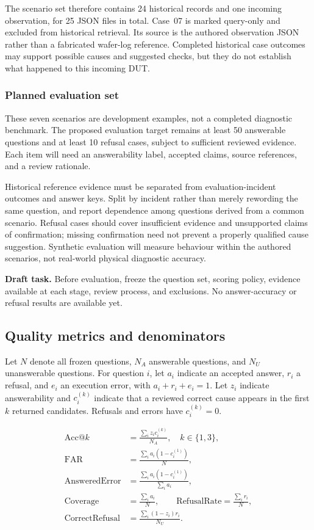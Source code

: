 \documentclass[conference]{IEEEtran}
\newcommand{\draftnote}[1]{%
\par\smallskip\noindent
\colorbox{pale}{%
\parbox{\dimexpr\columnwidth-2\fboxsep\relax}{%
\small\textbf{Draft task.} #1}}%
\par\smallskip}
\begin{document}
The scenario set therefore contains 24 historical records
and one incoming observation, for 25 JSON files in total.
Case~07 is marked query-only and excluded from historical
retrieval. Its source is the authored observation JSON rather
than a fabricated wafer-log reference. Completed historical
case outcomes may support possible causes and suggested checks,
but they do not establish what happened to this incoming DUT.

\subsubsection{Planned evaluation set}

These seven scenarios are development examples, not a completed
diagnostic benchmark. The proposed evaluation target remains
at least 50 answerable questions and at least 10 refusal cases,
subject to sufficient reviewed evidence. Each item will need
an answerability label, accepted claims, source references,
and a review rationale.

Historical reference evidence must be separated from
evaluation-incident outcomes and answer keys. Split by incident
rather than merely rewording the same question, and report
dependence among questions derived from a common scenario.
Refusal cases should cover insufficient evidence and unsupported
claims of confirmation; missing confirmation need not prevent
a properly qualified cause suggestion. Synthetic evaluation
will measure behaviour within the authored scenarios,
not real-world physical diagnostic accuracy.

\draftnote{
Before evaluation, freeze the question set, scoring policy,
evidence available at each stage, review process, and exclusions.
No answer-accuracy or refusal results are available yet.
}

\subsection{Quality metrics and denominators}

Let $N$ denote all frozen questions, $N_A$ answerable questions,
and $N_U$ unanswerable questions. For question $i$, let $a_i$
indicate an accepted answer, $r_i$ a refusal, and $e_i$ an
execution error, with $a_i+r_i+e_i=1$. Let $z_i$ indicate
answerability and $c_i^{(k)}$ indicate that a reviewed correct
cause appears in the first $k$ returned candidates.
Refusals and errors have $c_i^{(k)}=0$.

\begin{align}
\mathrm{Acc@}k &=
\frac{\sum_i z_i c_i^{(k)}}{N_A},
\quad k\in\{1,3\},\\
\mathrm{FAR} &=
\frac{\sum_i a_i(1-c_i^{(1)})}{N},\\
\mathrm{AnsweredError} &=
\frac{\sum_i a_i(1-c_i^{(1)})}{\sum_i a_i},\\
\mathrm{Coverage} &=
\frac{\sum_i a_i}{N},\qquad
\mathrm{RefusalRate}=\frac{\sum_i r_i}{N},\\
\mathrm{CorrectRefusal} &=
\frac{\sum_i(1-z_i)r_i}{N_U}.
\end{align}
\end{document}
